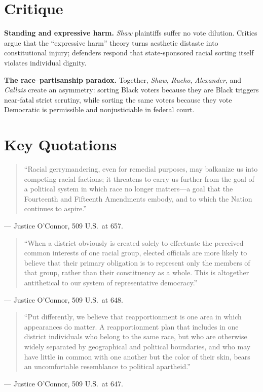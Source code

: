 \documentclass[12pt]{article}
\begin{document}
\section{Critique}

\textbf{Standing and expressive harm.} \textit{Shaw} plaintiffs suffer no vote dilution. Critics argue that the ``expressive harm'' theory turns aesthetic distaste into constitutional injury; defenders respond that state-sponsored racial sorting itself violates individual dignity.

\textbf{The race--partisanship paradox.} Together, \textit{Shaw}, \textit{Rucho}, \textit{Alexander}, and \textit{Callais} create an asymmetry: sorting Black voters because they are Black triggers near-fatal strict scrutiny, while sorting the same voters because they vote Democratic is permissible and nonjusticiable in federal court.

\section{Key Quotations}

\begin{quote}
``Racial gerrymandering, even for remedial purposes, may balkanize us into competing racial factions; it threatens to carry us further from the goal of a political system in which race no longer matters---a goal that the Fourteenth and Fifteenth Amendments embody, and to which the Nation continues to aspire.''
\end{quote}
\noindent --- Justice O'Connor, 509 U.S.\ at 657.

\begin{quote}
``When a district obviously is created solely to effectuate the perceived common interests of one racial group, elected officials are more likely to believe that their primary obligation is to represent only the members of that group, rather than their constituency as a whole. This is altogether antithetical to our system of representative democracy.''
\end{quote}
\noindent --- Justice O'Connor, 509 U.S.\ at 648.

\begin{quote}
``Put differently, we believe that reapportionment is one area in which appearances do matter. A reapportionment plan that includes in one district individuals who belong to the same race, but who are otherwise widely separated by geographical and political boundaries, and who may have little in common with one another but the color of their skin, bears an uncomfortable resemblance to political apartheid.''
\end{quote}
\noindent --- Justice O'Connor, 509 U.S.\ at 647.
\end{document}

